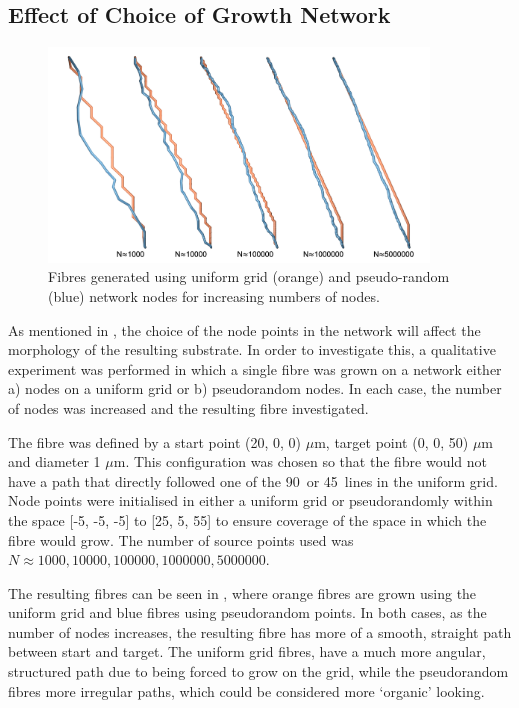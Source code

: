 \subsection{Effect of Choice of Growth Network}
\label{sec:config_choice_of_network}
\begin{figure}
  \centering
  \includegraphics[width=0.9\textwidth]{figures/config/uniform_vs_rand.png}
  \caption{Fibres generated using uniform grid (orange) and pseudo-random (blue) network nodes for increasing numbers of nodes.}
  \label{fig:config_uniform_vs_rand}
\end{figure}
As mentioned in , the choice of the node points in the network will affect the morphology of the resulting substrate.
In order to investigate this, a qualitative experiment was performed in which a single fibre was grown on a network either a) nodes on a uniform grid or b) pseudorandom nodes.
In each case, the number of nodes was increased and the resulting fibre investigated.

The fibre was defined by a start point (20, 0, 0) $\mu$m,  target point (0, 0, 50) $\mu$m and diameter 1 $\mu$m.
This configuration was chosen so that the fibre would not have a path that directly followed one of the 90\degree\ or 45\degree\ lines in the uniform grid.
Node points were initialised in either a uniform grid or pseudorandomly within the space [-5, -5, -5] to [25, 5, 55] to ensure coverage of the space in which the fibre would grow.
The number of source points used was $N \approx 1000, 10000, 100000, 1000000, 5000000$. 

The resulting fibres can be seen in , where orange fibres are grown using the uniform grid and blue fibres using pseudorandom points.
In both cases, as the number of nodes increases, the resulting fibre has more of a smooth, straight path between start and target.
The uniform grid fibres, have a much more angular, structured path due to being forced to grow on the grid, while the pseudorandom fibres more irregular paths, which could be considered more `organic' looking. 



